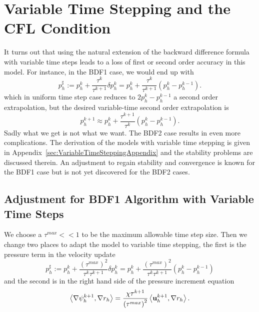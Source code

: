 \documentclass[letterpaper]{erdc}
\begin{document}
%
%
%
\section{Variable Time Stepping and the CFL Condition}\label{sec:VariableTimeSteppingAndCFL}

It turns out that using the natural extension of the backward difference
formula with variable time steps leads to a loss of first or second order
accuracy in this model.  For instance, in the BDF1 case, we would end up with
\begin{equation}
  p^{\sharp}_h := p_h^{k} + \frac{\tau^{k}}{\tau^{k+1}}\delta p_h^{k} = p_h^{k} + \frac{\tau^{k}}{\tau^{k+1}}\left( p_h^{k} - p_h^{k-1} \right).
\end{equation}
which in uniform time step case reduces to $2p^k_h-p_h^{k-1}$ a second order
extrapolation, but the desired variable-time second order extrapolation is
\begin{equation}
  p^{k+1}_h \approx p_h^{k} + \frac{\tau^{k+1}}{\tau^{k}}\left( p_h^{k} - p_h^{k-1} \right).
\end{equation}
Sadly what we get is not what we want.  The BDF2 case results in even more
complications.  The derivation of the models with variable time stepping is
given in Appendix~\ref{sec:VariableTimeSteppingAppendix} and the stability
problems are discussed therein.  An adjustment to regain stability and
convergence is known for the BDF1 case but is not yet discovered for the BDF2
cases.


%
%
\subsection{Adjustment for BDF1 Algorithm with Variable Time Steps}
We choose a $\tau^{max}<<1$ to be the maximum allowable time step size.  Then
we change two places to adapt the model to variable time stepping, the first is
the pressure term in the velocity update
\begin{equation}
  p^{\sharp}_h := p_h^{k} + \frac{\left(\tau^{max}\right)^2}{\tau^{k}\tau^{k+1}}\delta p_h^{k} = p_h^{k} + \frac{\left(\tau^{max}\right)^2}{\tau^{k}\tau^{k+1}}\left( p_h^{k} - p_h^{k-1} \right)
\end{equation}
and the second is in the right hand side of the pressure increment equation
\begin{equation}
  \left\langle \nabla\psi_h^{k+1}, \nabla r_h \right\rangle = \frac{\chi\tau^{k+1}}{\left(\tau^{max}\right)^2}\left\langle \textbf{u}_h^{k+1}, \nabla r_h \right\rangle.
\end{equation}
\end{document}
